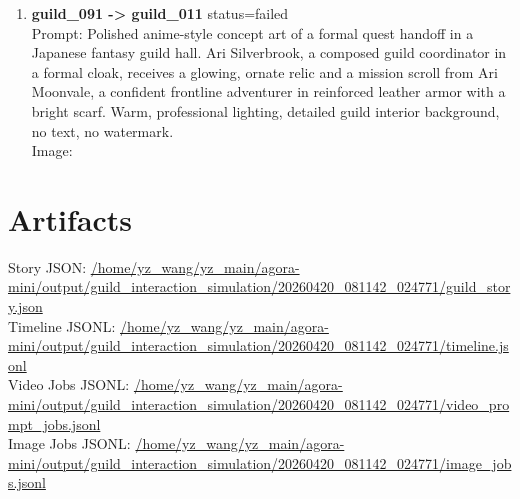 \documentclass[11pt,a4paper]{article}
\begin{document}
\begin{enumerate}
\item \textbf{guild\_091 -> guild\_011} status=failed\\\newline Prompt: Polished anime-style concept art of a formal quest handoff in a Japanese fantasy guild hall. Ari Silverbrook, a composed guild coordinator in a formal cloak, receives a glowing, ornate relic and a mission scroll from Ari Moonvale, a confident frontline adventurer in reinforced leather armor with a bright scarf. Warm, professional lighting, detailed guild interior background, no text, no watermark.\\\newline Image: \url{}
\end{enumerate}

\section{Artifacts}
Story JSON: \url{/home/yz\_wang/yz\_main/agora-mini/output/guild\_interaction\_simulation/20260420\_081142\_024771/guild\_story.json}\\
Timeline JSONL: \url{/home/yz\_wang/yz\_main/agora-mini/output/guild\_interaction\_simulation/20260420\_081142\_024771/timeline.jsonl}\\
Video Jobs JSONL: \url{/home/yz\_wang/yz\_main/agora-mini/output/guild\_interaction\_simulation/20260420\_081142\_024771/video\_prompt\_jobs.jsonl}\\
Image Jobs JSONL: \url{/home/yz\_wang/yz\_main/agora-mini/output/guild\_interaction\_simulation/20260420\_081142\_024771/image\_jobs.jsonl}\\
\end{document}
